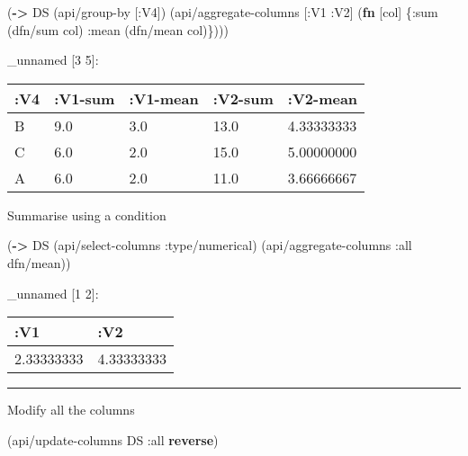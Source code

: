 \documentclass[]{article}
\newenvironment{Shaded}{\begin{snugshade}}{\end{snugshade}}
\newcommand{\AttributeTok}[1]{\textcolor[rgb]{0.77,0.63,0.00}{#1}}
\newcommand{\KeywordTok}[1]{\textcolor[rgb]{0.13,0.29,0.53}{\textbf{#1}}}
\newcommand{\NormalTok}[1]{#1}
\begin{document}
\begin{Shaded}
\begin{Highlighting}[]
\NormalTok{(}\KeywordTok{->}\NormalTok{ DS}
\NormalTok{    (api/group-by [}\AttributeTok{:V4}\NormalTok{])}
\NormalTok{    (api/aggregate-columns [}\AttributeTok{:V1} \AttributeTok{:V2}\NormalTok{] (}\KeywordTok{fn}\NormalTok{ [col]}
\NormalTok{                                       \{}\AttributeTok{:sum}\NormalTok{ (dfn/sum col)}
                                        \AttributeTok{:mean}\NormalTok{ (dfn/mean col)\})))}
\end{Highlighting}
\end{Shaded}

\_unnamed {[}3 5{]}:

\begin{longtable}[]{@{}lllll@{}}
\toprule
:V4 & :V1-sum & :V1-mean & :V2-sum & :V2-mean\tabularnewline
\midrule
\endhead
B & 9.0 & 3.0 & 13.0 & 4.33333333\tabularnewline
C & 6.0 & 2.0 & 15.0 & 5.00000000\tabularnewline
A & 6.0 & 2.0 & 11.0 & 3.66666667\tabularnewline
\bottomrule
\end{longtable}

Summarise using a condition

\begin{Shaded}
\begin{Highlighting}[]
\NormalTok{(}\KeywordTok{->}\NormalTok{ DS}
\NormalTok{    (api/select-columns }\AttributeTok{:type/numerical}\NormalTok{)}
\NormalTok{    (api/aggregate-columns }\AttributeTok{:all}\NormalTok{ dfn/mean))}
\end{Highlighting}
\end{Shaded}

\_unnamed {[}1 2{]}:

\begin{longtable}[]{@{}ll@{}}
\toprule
:V1 & :V2\tabularnewline
\midrule
\endhead
2.33333333 & 4.33333333\tabularnewline
\bottomrule
\end{longtable}

\begin{center}\rule{0.5\linewidth}{0.5pt}\end{center}

Modify all the columns

\begin{Shaded}
\begin{Highlighting}[]
\NormalTok{(api/update-columns DS }\AttributeTok{:all} \KeywordTok{reverse}\NormalTok{)}
\end{Highlighting}
\end{Shaded}
\end{document}
